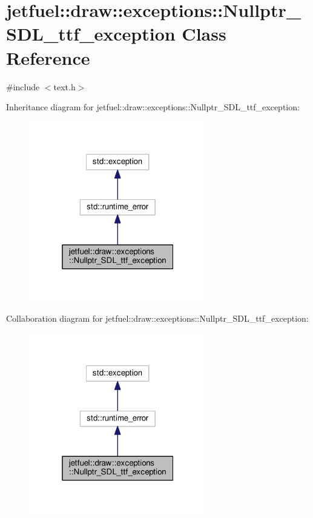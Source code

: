 \hypertarget{classjetfuel_1_1draw_1_1exceptions_1_1Nullptr__SDL__ttf__exception}{}\section{jetfuel\+:\+:draw\+:\+:exceptions\+:\+:Nullptr\+\_\+\+S\+D\+L\+\_\+ttf\+\_\+exception Class Reference}
\label{classjetfuel_1_1draw_1_1exceptions_1_1Nullptr__SDL__ttf__exception}


{\ttfamily \#include $<$text.\+h$>$}



Inheritance diagram for jetfuel\+:\+:draw\+:\+:exceptions\+:\+:Nullptr\+\_\+\+S\+D\+L\+\_\+ttf\+\_\+exception\+:\nopagebreak
\begin{figure}[H]
\begin{center}
\leavevmode
\includegraphics[width=217pt]{classjetfuel_1_1draw_1_1exceptions_1_1Nullptr__SDL__ttf__exception__inherit__graph}
\end{center}
\end{figure}


Collaboration diagram for jetfuel\+:\+:draw\+:\+:exceptions\+:\+:Nullptr\+\_\+\+S\+D\+L\+\_\+ttf\+\_\+exception\+:\nopagebreak
\begin{figure}[H]
\begin{center}
\leavevmode
\includegraphics[width=217pt]{classjetfuel_1_1draw_1_1exceptions_1_1Nullptr__SDL__ttf__exception__coll__graph}
\end{center}
\end{figure}
